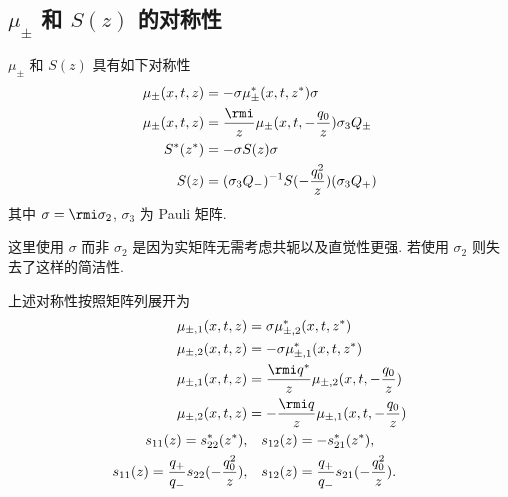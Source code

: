 \subsection{$\mu_{\pm}$ 和 $S(z)$ 的对称性}
\begin{theorem}
    $\mu_{\pm}$ 和 $S(z)$ 具有如下对称性
    \begin{align}
        \mu_{\pm}(x,t,z) & = - \sigma \mu_{\pm}^{*}(x,t,z^{*}) \sigma                           \\
        \mu_{\pm}(x,t,z) & = \frac{\rmi}{z} \mu_{\pm}(x,t, -\frac{q_{0}}{z}) \sigma_{3} Q_{\pm} \\
        S^{*}(z^{*})     & = - \sigma S(z) \sigma                                               \\
        S(z)             & = (\sigma_{3}Q_{-} )^{-1} S(-\frac{q_{0}^{2}}{z} )(\sigma_{3} Q_{+})
    \end{align}
    其中 $\sigma = \rmi \sigma_{2}$, $\sigma_{3} $ 为 Pauli 矩阵.
\end{theorem}
\begin{remark}
    这里使用 $\sigma$ 而非 $\sigma_{2}$ 是因为实矩阵无需考虑共轭以及直觉性更强. 若使用 $\sigma_{2}$ 则失去了这样的简洁性.
\end{remark}
上述对称性按照矩阵列展开为
\begin{align}
    \mu_{\pm,1}(x,t,z)                                           & = \sigma \mu_{\pm,2}^{*}(x,t,z^{*})
    \label{ch5-eq-sym-mu1}                                                                                                             \\
    \mu_{\pm,2}(x,t,z)                                           & = - \sigma \mu_{\pm,1}^{*}(x,t,z^{*})
    \label{ch5-eq-sym-mu2}                                                                                                             \\
    \mu_{\pm,1}(x,t,z)                                           & = \frac{\rmi q^{*}}{z} \mu_{\pm,2}(x,t, -\frac{q_{0}}{z})
    \label{ch5-eq-sym-mu3}                                                                                                             \\
    \mu_{\pm,2}(x,t,z)                                           & = - \frac{\rmi q}{z} \mu_{\pm,1}(x,t, -\frac{q_{0}}{z})
    \label{ch5-eq-sym-mu4}                                                                                                             \\
    s_{11}(z) = s_{22}^{*}(z^{*}),                               & \quad s_{12}(z) = - s_{21}^{*}(z^{*}),
    \label{ch5-eq-sym-scatter}                                                                                                         \\
    s_{11}(z) = \frac{q_{+}}{q_{-}}s_{22}(-\frac{q_{0}^{2}}{z}), & \quad s_{12}(z) = \frac{q_{+}}{q_{-}} s_{21}(-\frac{q_{0}^{2}}{z}).
    \label{ch5-eq-sym-scatter2}
\end{align}


